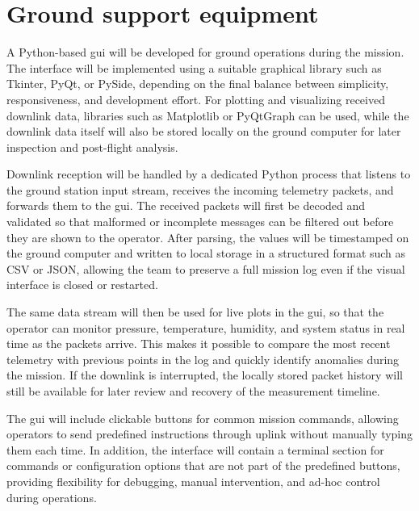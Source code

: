 \section{Ground support equipment}

A Python-based \gls{gui} will be developed for ground operations during the mission. The interface will be implemented using a suitable graphical library such as Tkinter, PyQt, or PySide, depending on the final balance between simplicity, responsiveness, and development effort. For plotting and visualizing received downlink data, libraries such as Matplotlib or PyQtGraph can be used, while the downlink data itself will also be stored locally on the ground computer for later inspection and post-flight analysis.

Downlink reception will be handled by a dedicated Python process that listens to the ground station input stream, receives the incoming telemetry packets, and forwards them to the \gls{gui}. The received packets will first be decoded and validated so that malformed or incomplete messages can be filtered out before they are shown to the operator. After parsing, the values will be timestamped on the ground computer and written to local storage in a structured format such as CSV or JSON, allowing the team to preserve a full mission log even if the visual interface is closed or restarted.

The same data stream will then be used for live plots in the \gls{gui}, so that the operator can monitor pressure, temperature, humidity, and system status in real time as the packets arrive. This makes it possible to compare the most recent telemetry with previous points in the log and quickly identify anomalies during the mission. If the downlink is interrupted, the locally stored packet history will still be available for later review and recovery of the measurement timeline.

The \gls{gui} will include clickable buttons for common mission commands, allowing operators to send predefined instructions through uplink without manually typing them each time. In addition, the interface will contain a terminal section for commands or configuration options that are not part of the predefined buttons, providing flexibility for debugging, manual intervention, and ad-hoc control during operations.

